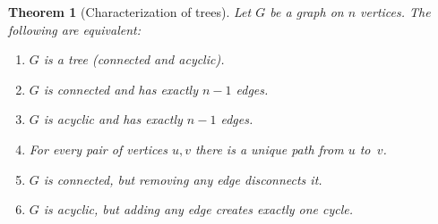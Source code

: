 \documentclass[12pt,a4paper,openany]{book}
\theoremstyle{definition}
\theoremstyle{plain}
\newtheorem{theorem}[definition]{Theorem}
\theoremstyle{remark}
\begin{document}
\begin{theorem}[Characterization of trees]
\label{thm:tree-char}
Let $G$ be a graph on $n$ vertices.  The following are equivalent:
\begin{enumerate}
  \item $G$ is a tree (connected and acyclic).
  \item $G$ is connected and has exactly $n-1$ edges.
  \item $G$ is acyclic and has exactly $n-1$ edges.
  \item For every pair of vertices $u,v$ there is a unique path
        from $u$ to~$v$.
  \item $G$ is connected, but removing any edge disconnects it.
  \item $G$ is acyclic, but adding any edge creates exactly one cycle.
\end{enumerate}
\end{theorem}
\end{document}
